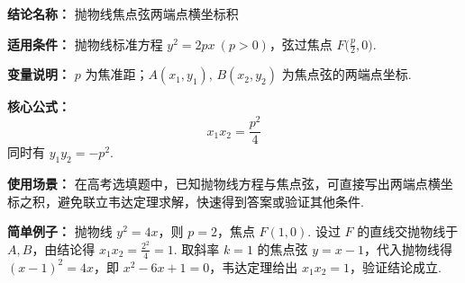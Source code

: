 \textbf{结论名称：} 抛物线焦点弦两端点横坐标积

\textbf{适用条件：} 抛物线标准方程 \(y^2=2px\ (p>0)\)，弦过焦点 \(F\bigl(\frac{p}{2},0\bigr)\).

\textbf{变量说明：} \(p\) 为焦准距；\(A(x_1,y_1)\), \(B(x_2,y_2)\) 为焦点弦的两端点坐标.

\textbf{核心公式：}
\[
\boxed{x_1 x_2 = \frac{p^2}{4}}
\]
同时有 \(y_1 y_2 = -p^2\).

\textbf{使用场景：} 在高考选填题中，已知抛物线方程与焦点弦，可直接写出两端点横坐标之积，避免联立韦达定理求解，快速得到答案或验证其他条件.

\textbf{简单例子：} 抛物线 \(y^2=4x\)，则 \(p=2\)，焦点 \(F(1,0)\). 设过 \(F\) 的直线交抛物线于 \(A,B\)，由结论得 \(x_1 x_2=\frac{2^2}{4}=1\). 取斜率 \(k=1\) 的焦点弦 \(y=x-1\)，代入抛物线得 \((x-1)^2=4x\)，即 \(x^2-6x+1=0\)，韦达定理给出 \(x_1x_2=1\)，验证结论成立.